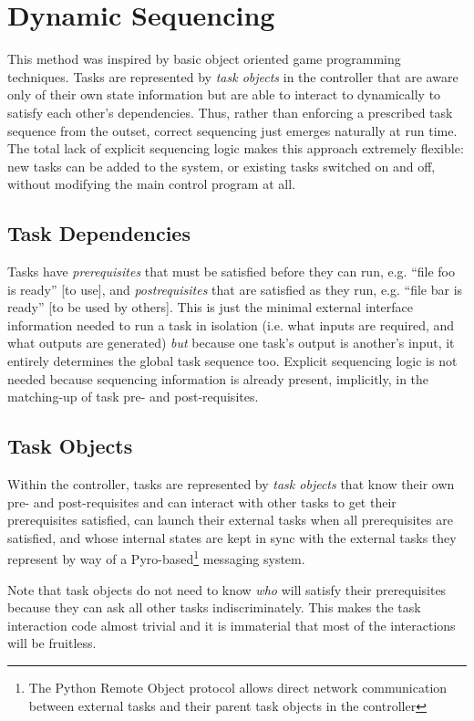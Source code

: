 \documentclass[12pt]{amsart}
\begin{document}
\section{Dynamic Sequencing}

This method was inspired by basic object oriented game programming
techniques. Tasks are represented by {\em task objects} in the
controller that are aware only of their own state information but are
able to interact to dynamically to satisfy each other's dependencies.
Thus, rather than enforcing a prescribed task sequence from the outset,
correct sequencing just emerges naturally at run time. The total lack of
explicit sequencing logic makes this approach extremely flexible: new
tasks can be added to the system, or existing tasks switched on and off,
without modifying the main control program at all.


\subsection{Task Dependencies}

Tasks have {\em prerequisites} that must be satisfied before they can
run, e.g. ``file foo is ready'' [to use], and {\em postrequisites} that
are satisfied as they run, e.g. ``file bar is ready'' [to be used by
others]. This is just the minimal external interface information needed
to run a task in isolation (i.e. what inputs are required, and what
outputs are generated) {\em but} because one task's output is another's
input, it entirely determines the global task sequence too. Explicit
sequencing logic is not needed because sequencing information is already
present, implicitly, in the matching-up of task pre- and
post-requisites. 

\subsection{Task Objects}

Within the controller, tasks are represented by {\em task objects} that
know their own pre- and post-requisites and can interact with other
tasks to get their prerequisites satisfied, can launch their external
tasks when all prerequisites are satisfied, and whose internal states
are kept in sync with the external tasks they represent by way of a
Pyro-based\footnote{The Python Remote Object protocol allows direct
network communication between external tasks and their parent task
objects in the controller} messaging system. 

Note that task objects do not need to know {\em who} will satisfy their
prerequisites because they can ask all other tasks indiscriminately.
This makes the task interaction code almost trivial and it is immaterial
that most of the interactions will be fruitless. 
\end{document}

